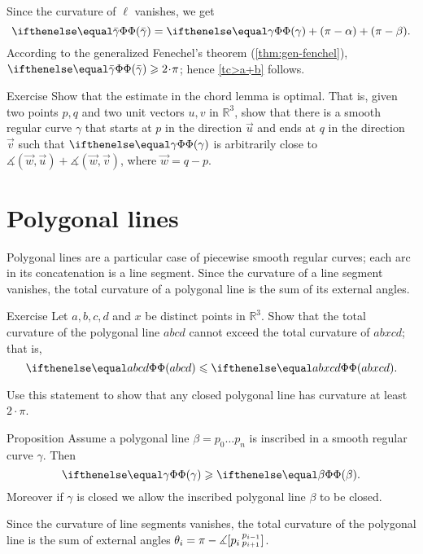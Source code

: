 Since the curvature of $\ell$ vanishes, we get 
\[\tc{\bar\gamma}=\tc\gamma+(\pi-\alpha)+(\pi-\beta).\]
According to the generalized Fenechel's theorem (\ref{thm:gen-fenchel}),
$\tc{\bar\gamma}\ge 2\cdot\pi$;
hence \ref{tc>a+b} follows.
\qeds

\begin{thm}{Exercise}\label{ex:chord-lemma-optimal}
Show that the estimate in the chord lemma is optimal.
That is, given two points $p, q$ and two unit vectors $u,v$ in $\mathbb{R}^3$,
show that there is a smooth regular curve $\gamma$ that starts at $p$ in the direction $\vec u$ and ends at $q$ in the direction $\vec v$ such that 
$\tc\gamma$ is arbitrarily close to $\measuredangle(\vec w,\vec u)+\measuredangle(\vec w,\vec v)$, where $\vec w=q-p$.

\end{thm}

\section{Polygonal lines} 

Polygonal lines are a particular case of piecewise smooth regular curves;
each arc in its concatenation is a line segment.
Since the curvature of a line segment vanishes, the total curvature of a polygonal line is the sum of its external angles.

\begin{thm}{Exercise}\label{ex:monotonic-tc}
Let $a,b,c,d$ and $x$ be distinct points in $\mathbb{R}^3$.
Show that the total curvature of the polygonal line $abcd$ cannot exceed the total curvature of $abxcd$; that is, 
\[\tc {abcd} \le \tc {abxcd}.\]

Use this statement to show that any closed polygonal line has curvature at least $2\cdot\pi$.
\end{thm}



\begin{thm}{Proposition}\label{prop:inscribed-total-curvature}
Assume a polygonal line $\beta=p_0\dots p_n$ is inscribed in a smooth regular curve $\gamma$.
Then 
\[\tc\gamma\ge \tc{\beta}.\]
Moreover if $\gamma$ is closed we allow the inscribed polygonal line $\beta$ to be closed.

\end{thm}

Since the curvature of line segments vanishes, 
the total curvature of the polygonal line is the sum of external angles $\theta_i=\pi-
\measuredangle[p_i\,{}^{p_{i-1}}_{p_{i+1}}]$.

